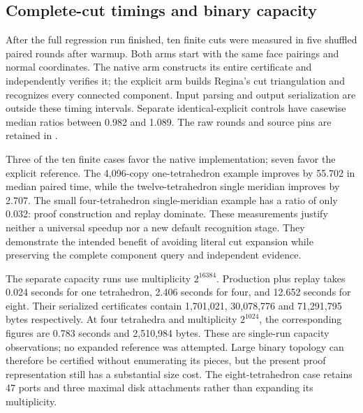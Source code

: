 \subsection{Complete-cut timings and binary capacity}

After the full regression run finished, ten finite cuts were measured in
five shuffled paired rounds after warmup. Both arms start with the same
face pairings and normal coordinates. The native arm constructs its entire
certificate and independently verifies it; the explicit arm builds Regina's
cut triangulation and recognizes every connected component. Input parsing
and output serialization are outside these timing intervals. Separate
identical-explicit controls have casewise median ratios between 0.982 and
1.089. The raw rounds and source pins are retained in
.



Three of the ten finite cases favor the native implementation; seven favor
the explicit reference. The 4,096-copy one-tetrahedron example improves by
55.702 in median paired time, while the twelve-tetrahedron single meridian
improves by 2.707. The small four-tetrahedron single-meridian example has a
ratio of only 0.032: proof construction and replay dominate. These measurements
justify neither a universal speedup nor a new default recognition stage.
They demonstrate the intended benefit of avoiding literal cut expansion
while preserving the complete component query and independent evidence.

The separate capacity runs use multiplicity $2^{16384}$. Production plus
replay takes 0.024 seconds for one tetrahedron, 2.406 seconds for four, and
12.652 seconds for eight. Their serialized certificates contain 1,701,021,
30,078,776 and 71,291,795 bytes respectively. At four tetrahedra and
multiplicity $2^{1024}$, the corresponding figures are 0.783 seconds and
2,510,984 bytes. These are single-run capacity observations; no expanded
reference was attempted. Large binary topology can therefore be certified
without enumerating its pieces, but the present proof representation still
has a substantial size cost. The eight-tetrahedron case retains 47 ports
and three maximal disk attachments rather than expanding its multiplicity.
